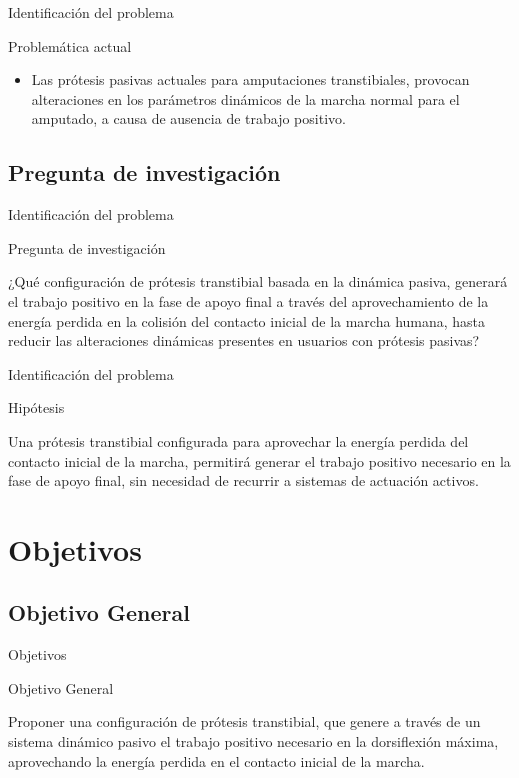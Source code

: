 \documentclass[10pt]{beamer}
\begin{document}
\begin{frame}{Identificación del problema}

\begin{exampleblock}{Problemática actual}

\begin{itemize}
\item Las prótesis pasivas actuales para amputaciones transtibiales, provocan
alteraciones en los parámetros dinámicos de la marcha normal para
el amputado, a causa de ausencia de trabajo positivo.
\end{itemize}
\end{exampleblock}
\end{frame}


\subsection{Pregunta de investigación}
\begin{frame}{Identificación del problema}

\begin{block}{Pregunta de investigación}

¿Qué configuración de prótesis transtibial basada en la dinámica pasiva,
generará el trabajo positivo en la fase de apoyo final a través del
aprovechamiento de la energía perdida en la colisión del contacto
inicial de la marcha humana, hasta reducir las alteraciones dinámicas
presentes en usuarios con prótesis pasivas?

\end{block}
\end{frame}

\begin{frame}{Identificación del problema}

\begin{block}{Hipótesis}

Una prótesis transtibial configurada para aprovechar la energía perdida
del contacto inicial de la marcha, permitirá generar el trabajo positivo
necesario en la fase de apoyo final, sin necesidad de recurrir a sistemas
de actuación activos. 

\end{block}
\end{frame}


\section{Objetivos}

\subsection{Objetivo General}
\begin{frame}{Objetivos}

\begin{alertblock}{Objetivo General}

Proponer una configuración de prótesis transtibial, que genere a través
de un sistema dinámico pasivo el trabajo positivo necesario en la
dorsiflexión máxima, aprovechando la energía perdida en el contacto
inicial de la marcha.
\end{alertblock}
\end{frame}
\end{document}

